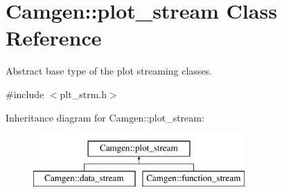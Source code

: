\hypertarget{a00427}{\section{Camgen\-:\-:plot\-\_\-stream Class Reference}
\label{a00427}
}


Abstract base type of the plot streaming classes.  




{\ttfamily \#include $<$plt\-\_\-strm.\-h$>$}

Inheritance diagram for Camgen\-:\-:plot\-\_\-stream\-:\begin{figure}[H]
\begin{center}
\leavevmode
\includegraphics[height=2.000000cm]{a00427}
\end{center}
\end{figure}
